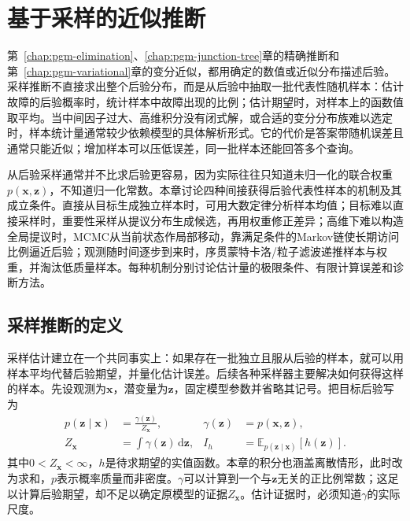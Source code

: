 \chapter{基于采样的近似推断}
\label{chap:pgm-sampling}

第~\ref{chap:pgm-elimination}、\ref{chap:pgm-junction-tree}章的精确推断和第~\ref{chap:pgm-variational}章的变分近似，都用确定的数值或近似分布描述后验。采样推断不直接求出整个后验分布，而是从后验中抽取一批代表性随机样本：估计故障的后验概率时，统计样本中故障出现的比例；估计期望时，对样本上的函数值取平均。当中间因子过大、高维积分没有闭式解，或合适的变分分布族难以选定时，样本统计量通常较少依赖模型的具体解析形式。它的代价是答案带随机误差且通常只能近似；增加样本可以压低误差，同一批样本还能回答多个查询。

从后验采样通常并不比求后验更容易，因为实际往往只知道未归一化的联合权重$p(\bm{x},\bm{z})$，不知道归一化常数。本章讨论四种间接获得后验代表性样本的机制及其成立条件。直接从目标生成独立样本时，可用大数定律分析样本均值；目标难以直接采样时，重要性采样从提议分布生成候选，再用权重修正差异；高维下难以构造全局提议时，MCMC从当前状态作局部移动，靠满足条件的Markov链使长期访问比例逼近后验；观测随时间逐步到来时，序贯蒙特卡洛/粒子滤波递推样本与权重，并淘汰低质量样本。每种机制分别讨论估计量的极限条件、有限计算误差和诊断方法。

\section{采样推断的定义}
\label{sec:pgm-sampling-definition}

采样估计建立在一个共同事实上：如果存在一批独立且服从后验的样本，就可以用样本平均代替后验期望，并量化估计误差。后续各种采样器主要解决如何获得这样的样本。先设观测为$\bm{x}$，潜变量为$\bm{z}$，固定模型参数并省略其记号。把目标后验写为
\begin{equation}
  \begin{aligned}
    p(\bm{z}\mid\bm{x})&=\frac{\gamma(\bm{z})}{Z_{\bm{x}}},&
    \gamma(\bm{z})&=p(\bm{x},\bm{z}),\\
    Z_{\bm{x}}&=\int\gamma(\bm{z})\,\mathrm{d}\bm{z},&
    I_h&=\mathbb{E}_{p(\bm{z}\mid\bm{x})}[h(\bm{z})].
  \end{aligned}
  \label{eq:pgm-sampling-target}
\end{equation}
其中$0<Z_{\bm{x}}<\infty$，$h$是待求期望的实值函数。本章的积分也涵盖离散情形，此时改为求和，$p$表示概率质量而非密度。$\gamma$可以计算到一个与$\bm{z}$无关的正比例常数；这足以计算后验期望，却不足以确定原模型的证据$Z_{\bm{x}}$。估计证据时，必须知道$\gamma$的实际尺度。

